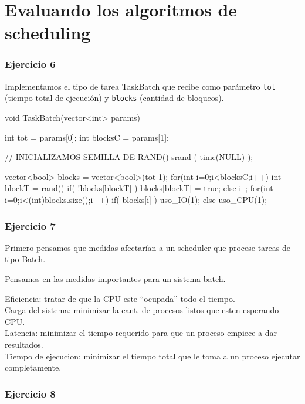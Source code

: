 \part{Evaluando los algoritmos de scheduling}

\section{Ejercicio 6}

Implementamos el tipo de tarea TaskBatch que recibe como par\'ametro \verb|tot| (tiempo total de ejecuci\'on) y \verb|blocks| (cantidad de bloqueos).

\begin{framed}
\begin{verbatimtab}
void TaskBatch(vector<int> params) {
	int tot = params[0];
	int blocksC = params[1];
	
	// INICIALIZAMOS SEMILLA DE RAND()
	srand ( time(NULL) );
	
	vector<bool> blocks = vector<bool>(tot-1);
	for(int i=0;i<blocksC;i++) {
		int blockT = rand()%
		if( !blocks[blockT] )
			blocks[blockT] = true;
		else
			i--;
	}
	for(int i=0;i<(int)blocks.size();i++) {
		if( blocks[i] )
			uso_IO(1);
		else
			uso_CPU(1);
	}
}
\end{verbatimtab}
\end{framed}

\section{Ejercicio 7}

Primero pensamos que medidas afectar\'ian a un scheduler que procese tareas de tipo Batch.

Pensamos en las medidas importantes para un sistema batch.

Eficiencia: tratar de que la CPU este ``ocupada'' todo el tiempo.\\
Carga del sistema: minimizar la cant. de procesos listos que esten esperando CPU.\\
Latencia: minimizar el tiempo requerido para que un proceso empiece a dar resultados.\\
Tiempo de ejecucion: minimizar el tiempo total que le toma a un proceso ejecutar completamente.

\section{Ejercicio 8}

